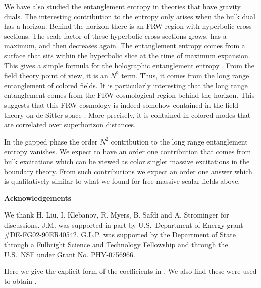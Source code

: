 We have also studied the entanglement entropy in theories that have gravity duals. The interesting
contribution to the entropy only arises when the bulk dual has a horizon. Behind the horizon there
 is an FRW region with hyperbolic cross sections. The scale factor of these hyperbolic cross sections
 grows, has a maximum, 
  and then decreases again. The entanglement entropy comes from a surface that
 sits within  the hyperbolic slice at the time of  maximum expansion. This gives a simple formula
 for the holographic entanglement entropy \acsby .
 From the field theory point of view, it is an $N^2$ term. Thus, it comes from the long range
 entanglement of colored fields. It is particularly interesting that the long range entanglement comes from the FRW cosmological
 region behind the horizon. 
 This suggests that this FRW cosmology is indeed somehow contained in the
 field theory on de Sitter space  . 
  More precisely, it is contained in colored modes that are correlated
 over superhorizon distances. 
 
 In the gapped phase the order $N^2$ contribution to the long range entanglement
 entropy vanishes. We expect to have an order one contribution that comes from bulk excitations which
 can be viewed as color singlet massive excitations in the boundary theory. From such contributions we
 expect an order one answer which is qualitatively similar to what we found for free massive scalar fields above. 


{\bf Acknowledgements }

We thank H. Liu, I. Klebanov, R. Myers, B. Safdi and A. Strominger for discussions.
J.M. was  supported in part by U.S.~Department of Energy
grant \#DE-FG02-90ER40542. G.L.P. was supported by
the Department of State through a Fulbright Science and Technology Fellowship and through the
U.S.~NSF under Grant No. PHY-0756966.




Here we give the explicit form of the coefficients in \basis .
\eqn{}
We also find
\eqn{}
these were used to obtain \solex .


